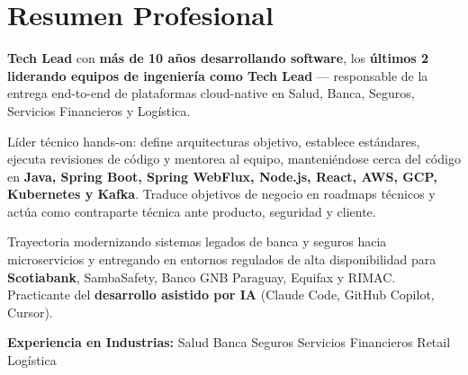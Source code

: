 
\section{Resumen Profesional}

{\small
\textbf{Tech Lead} con \textbf{más de 10 años desarrollando software}, los \textbf{últimos 2
liderando equipos de ingeniería como Tech Lead} — responsable de la entrega end-to-end de
plataformas cloud-native en Salud, Banca, Seguros, Servicios Financieros y Logística.

\vspace{3pt}
Líder técnico hands-on: define arquitecturas objetivo, establece estándares, ejecuta revisiones de
código y mentorea al equipo, manteniéndose cerca del código en \textbf{Java, Spring Boot, Spring
WebFlux, Node.js, React, AWS, GCP, Kubernetes y Kafka}. Traduce objetivos de negocio en roadmaps
técnicos y actúa como contraparte técnica ante producto, seguridad y cliente.

\vspace{3pt}
Trayectoria modernizando sistemas legados de banca y seguros hacia microservicios y entregando en
entornos regulados de alta disponibilidad para \textbf{Scotiabank}, SambaSafety, Banco GNB Paraguay,
Equifax y RIMAC. Practicante del \textbf{desarrollo asistido por IA} (Claude Code, GitHub
Copilot, Cursor).
}

\vspace{4pt}
{\small\color{cvMuted}%
  \textbf{Experiencia en Industrias:}\enspace%
  Salud\enspace\textbar\enspace
  Banca\enspace\textbar\enspace
  Seguros\enspace\textbar\enspace
  Servicios Financieros\enspace\textbar\enspace
  Retail\enspace\textbar\enspace
  Logística%
}
